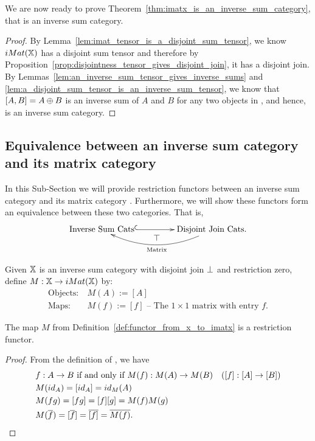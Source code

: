 We are now ready to prove Theorem~\ref{thm:imatx_is_an_inverse_sum_category}, that \imatx is an
inverse sum category.

\begin{proof}
  By Lemma~\ref{lem:imat_tensor_is_a_disjoint_sum_tensor}, we know $iMat({\mathbb{X}})$ has a disjoint sum
  tensor and therefore by Proposition~\ref{prop:disjointness_tensor_gives_disjoint_join},
  it has a disjoint join. By Lemmas~\ref{lem:an_inverse_sum_tensor_gives_inverse_sums} and
  \ref{lem:a_disjoint_sum_tensor_is_an_inverse_sum_tensor}, we know that $[A,B] = A\oplus B$ is
  an inverse sum of $A$ and $B$ for any two objects in \imatx, and hence, \imatx is an inverse
  sum category.
\end{proof}

\subsection{Equivalence between an inverse sum category and its matrix category} %
\label{sub:equivalence_between_an_inverse_sum_category_and_its_matrix_category}
In this Sub-Section we will provide restriction functors between an inverse sum category
\X and its matrix category \imatx. Furthermore, we will show these functors form an
equivalence between these two categories. That is,
\[
   \xymatrix@R+10pt@C+20pt{
     \text{Inverse Sum Cats} \ar@{^{(}->}[r]
     & \text{Disjoint Join Cats.} \ar@/^1.5pc/[l]_{\raisebox{2pt}{$\top$}}^{\text{Matrix}}
   }
\]
\begin{definition}\label{def:functor_from_x_to_imatx}
  Given $\mathbb{X}$ is an inverse sum category with disjoint join $\perp$ and restriction zero,
  define $M:\mathbb{X} \to iMat({\mathbb{X}})$ by:
  \begin{align*}
    \text{Objects:}\ &M(A) := [A]\\
    \text{Maps:}\ &M(f) := [f] \text{ -- The }1\times1\text{ matrix with entry }f.
  \end{align*}
\end{definition}
\begin{lemma}\label{lem:m_is_a_functor}
  The map $M$ from Definition~\ref{def:functor_from_x_to_imatx} is a restriction functor.
\end{lemma}
\begin{proof}
  From the definition of \imatx, we have
  \begin{align*}
    &f: A\to B \text{ if and only if } M(f):M(A)\to M(B)\quad ([f]: [A]\to [B])\\
    &M(id_A)  = [id_{A}] = id_M(A)\\
    &M(f g) = [f g] = [f][g] = M(f) M(g)\\
    &M(\overline{f}) = [\overline{f}] = \overline{[f]} = \overline{M(f)}.
  \end{align*}
\end{proof}

